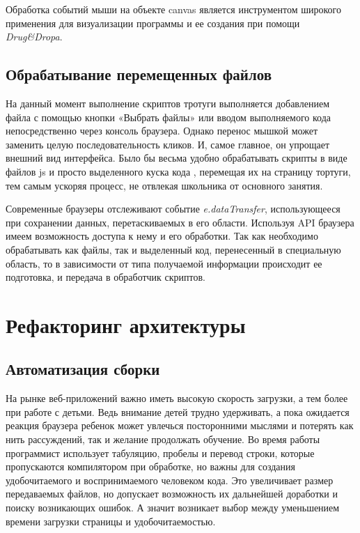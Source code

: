 Обработка событий мыши на объекте canvas является инструментом  широкого применения для визуализации программы и ее создания при помощи \textit{Drug\&Dropa}.



\section{Обрабатывание перемещенных файлов} \label{sect1_1}
На данный момент выполнение скриптов тротуги выполняется добавлением файла с помощью кнопки «Выбрать файлы» или вводом выполняемого кода непосредственно через консоль браузера. Однако перенос мышкой может заменить целую последовательность кликов. И, самое главное, он упрощает внешний вид интерфейса. Было бы весьма удобно обрабатывать скрипты в виде файлов js и просто выделенного куска кода , перемещая их  на страницу тортуги, тем самым ускоряя процесс, не отвлекая школьника от основного занятия.

Современные браузеры отслеживают событие \textit{e.dataTransfer}, использующееся при сохранении данных, перетаскиваемых в его области. Используя API браузера имеем возможность доступа к нему и его обработки. Так как необходимо обрабатывать как файлы, так и выделенный код, перенесенный в специальную область, то в зависимости от типа получаемой информации  происходит ее подготовка, и передача в обработчик скриптов.

\chapter{Рефакторинг архитектуры} \label{chapt1}


\section{Автоматизация сборки} \label{sect1_1}

На рынке веб-приложений важно иметь высокую скорость загрузки, а тем более при работе с детьми. Ведь внимание детей трудно удерживать, а пока ожидается реакция браузера ребенок может увлечься посторонними мыслями и потерять как нить рассуждений, так и желание продолжать обучение. 
Во время работы программист использует табуляцию, пробелы и перевод строки, которые пропускаются компилятором при обработке, но важны для создания удобочитаемого и воспринимаемого человеком кода. Это увеличивает размер передаваемых файлов, но допускает возможность их дальнейшей доработки и поиску возникающих ошибок. А значит возникает выбор между уменьшением времени загрузки страницы и удобочитаемостью.

